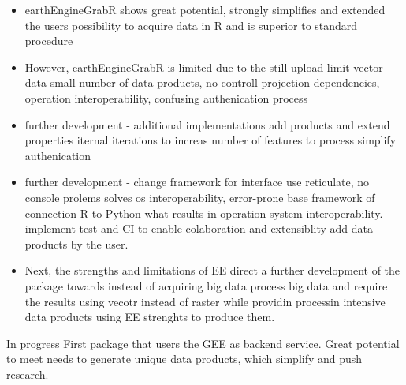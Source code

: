 \begin{itemize}


	\item earthEngineGrabR shows great potential, strongly simplifies and extended the users possibility to acquire data in R and is superior to standard procedure
	\item However, earthEngineGrabR is limited due to the still
	\subitem upload limit vector data
	\subitem small number of data products, 
	\subitem no controll projection
	\subitem dependencies, operation interoperability, confusing authenication process
	\item further development - additional implementations
	\subitem add products and extend properties
	\subitem iternal iterations to increas number of features to process
	\subitem simplify authenication
	\item further development - change framework for interface
	\subitem use reticulate, no console prolems solves os interoperability, error-prone base framework of connection R to Python what results in operation system interoperability.
	\subitem implement test and CI to enable colaboration and extensiblity add data products by the user.
	\item Next, the strengths and limitations of EE direct a further development of the package towards 
	\subitem instead of acquiring big data process big data and require the results using vecotr instead of raster
	\subitem while providin processin intensive data products using EE strenghts to produce them.
\end{itemize}


In progress
First package that users the GEE as backend service.
Great potential to meet needs to generate unique data products, which simplify and push research.


